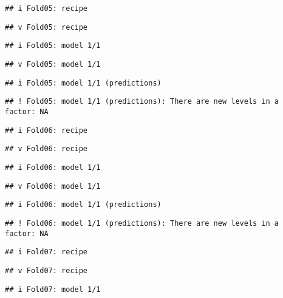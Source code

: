 \documentclass[
]{article}
\begin{document}
\begin{verbatim}
## i Fold05: recipe
\end{verbatim}

\begin{verbatim}
## v Fold05: recipe
\end{verbatim}

\begin{verbatim}
## i Fold05: model 1/1
\end{verbatim}

\begin{verbatim}
## v Fold05: model 1/1
\end{verbatim}

\begin{verbatim}
## i Fold05: model 1/1 (predictions)
\end{verbatim}

\begin{verbatim}
## ! Fold05: model 1/1 (predictions): There are new levels in a factor: NA
\end{verbatim}

\begin{verbatim}
## i Fold06: recipe
\end{verbatim}

\begin{verbatim}
## v Fold06: recipe
\end{verbatim}

\begin{verbatim}
## i Fold06: model 1/1
\end{verbatim}

\begin{verbatim}
## v Fold06: model 1/1
\end{verbatim}

\begin{verbatim}
## i Fold06: model 1/1 (predictions)
\end{verbatim}

\begin{verbatim}
## ! Fold06: model 1/1 (predictions): There are new levels in a factor: NA
\end{verbatim}

\begin{verbatim}
## i Fold07: recipe
\end{verbatim}

\begin{verbatim}
## v Fold07: recipe
\end{verbatim}

\begin{verbatim}
## i Fold07: model 1/1
\end{verbatim}
\end{document}
